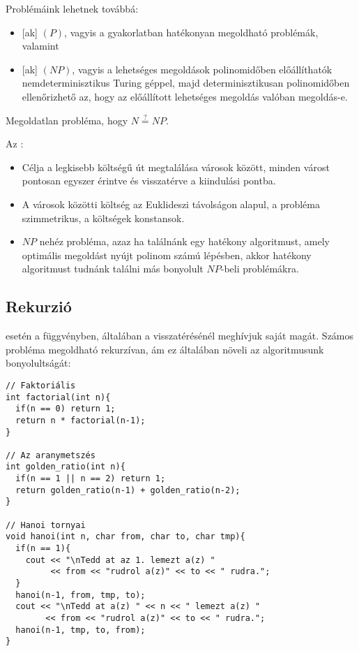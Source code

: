 \documentclass[../../main.tex]{subfiles}
\begin{document}
Problémáink lehetnek továbbá:
\begin{itemize}
  \item {}[ak] $(P)$, vagyis a gyakorlatban
        hatékonyan megoldható problémák, valamint
  \item {}[ak] $(NP)$, vagyis a lehetséges megoldások
        polinomidőben előállíthatók nemdeterminisztikus Turing géppel,
        majd determinisztikusan polinomidőben ellenőrizhető az,
        hogy az előállított lehetséges megoldás valóban megoldás-e.
\end{itemize}
Megoldatlan probléma, hogy $N \overset{?}{=} NP$.

Az :
\begin{itemize}
  \item Célja a legkisebb költségű út megtalálása városok között, minden
        várost pontosan egyszer érintve és visszatérve a kiindulási pontba.

  \item A városok közötti költség az Euklideszi távolságon alapul,
        a probléma szimmetrikus, a költségek konstansok.

  \item $NP$ nehéz probléma, azaz ha találnánk egy hatékony algoritmust,
        amely optimális megoldást nyújt polinom számú lépésben, akkor hatékony
        algoritmust tudnánk találni más bonyolult $NP$-beli problémákra.
\end{itemize}

\subsection{Rekurzió}

 esetén a függvényben, általában a visszatérésénél meghívjuk
saját magát. Számos probléma megoldható rekurzívan, ám ez általában növeli
az algoritmusunk bonyolultságát:

\begin{verbatim}
// Faktoriális
int factorial(int n){
  if(n == 0) return 1;
  return n * factorial(n-1);
}

// Az aranymetszés
int golden_ratio(int n){
  if(n == 1 || n == 2) return 1;
  return golden_ratio(n-1) + golden_ratio(n-2);
}

// Hanoi tornyai
void hanoi(int n, char from, char to, char tmp){
  if(n == 1){
    cout << "\nTedd at az 1. lemezt a(z) "
         << from << "rudrol a(z)" << to << " rudra.";
  }
  hanoi(n-1, from, tmp, to);
  cout << "\nTedd at a(z) " << n << " lemezt a(z) "
        << from << "rudrol a(z)" << to << " rudra.";
  hanoi(n-1, tmp, to, from);
}
\end{verbatim}
\end{document}
